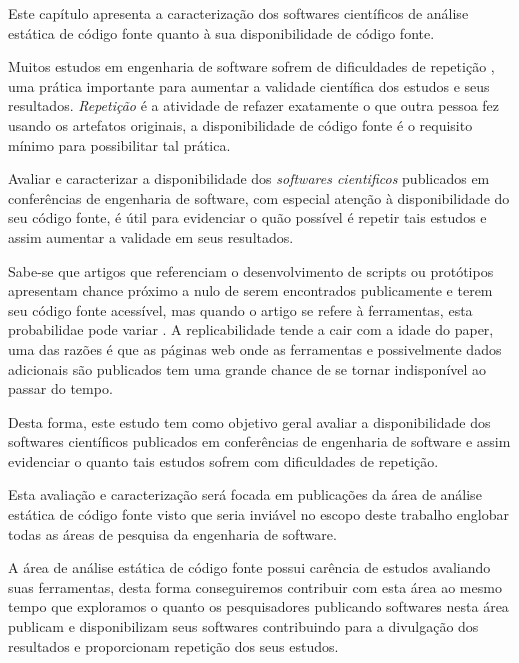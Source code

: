 {Este capítulo apresenta a caracterização dos softwares científicos de análise
estática de código fonte quanto à sua disponibilidade de código fonte.}
\label{caracterizacao-ferramentas}


Muitos estudos em engenharia de software sofrem de dificuldades de repetição
\cite{Tang2016}, uma prática importante para aumentar a validade científica dos
estudos e seus resultados. {\it Repetição} é a atividade de refazer exatamente
o que outra pessoa fez usando os artefatos originais, a disponibilidade de
código fonte é o requisito mínimo para possibilitar tal prática.

Avaliar e caracterizar a disponibilidade dos {\it softwares cientificos}
publicados em conferências de engenharia de software, com especial atenção à
disponibilidade do seu código fonte, é útil para evidenciar o quão possível é
repetir tais estudos e assim aumentar a validade em seus resultados.

Sabe-se que artigos que referenciam o desenvolvimento de scripts ou protótipos
apresentam chance próximo a nulo de serem encontrados publicamente e terem seu
código fonte acessível, mas quando o artigo se refere à ferramentas, esta
probabilidae pode variar \cite{robles2010replicating}. A replicabilidade tende
a cair com a idade do paper, uma das razões é que as páginas web onde as
ferramentas e possivelmente dados adicionais são publicados tem uma grande
chance de se tornar indisponível ao passar do tempo.

Desta forma, este estudo tem como objetivo geral avaliar a disponibilidade dos
softwares científicos publicados em conferências de engenharia de software e
assim evidenciar o quanto tais estudos sofrem com dificuldades de repetição.

Esta avaliação e caracterização será focada em publicações da área de análise
estática de código fonte visto que seria inviável no escopo deste trabalho
englobar todas as áreas de pesquisa da engenharia de software.

A área de análise estática de código fonte possui carência de estudos avaliando
suas ferramentas, desta forma conseguiremos contribuir com esta área ao mesmo
tempo que exploramos o quanto os pesquisadores publicando softwares nesta área
publicam e disponibilizam seus softwares contribuindo para a divulgação dos
resultados e proporcionam repetição dos seus estudos.


